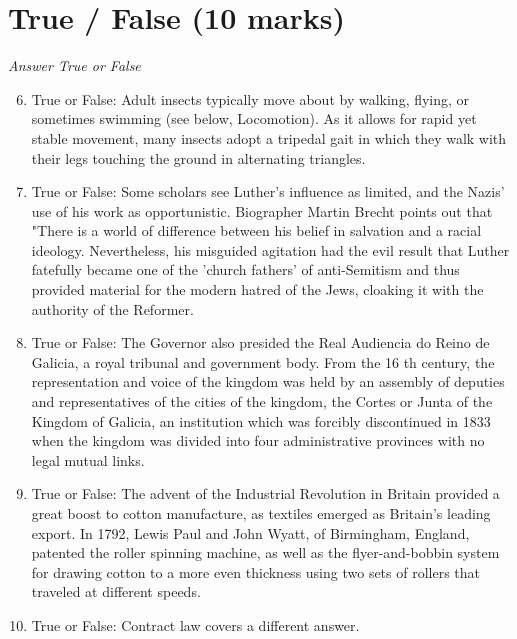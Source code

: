 \documentclass[12pt]{article}
\begin{document}
\section*{True / False (10 marks)}
\textit{Answer True or False}
\begin{enumerate}[label=\arabic*.]
\setcounter{enumi}{5}
\item True or False: Adult insects typically move about by walking, flying, or sometimes swimming (see below, Locomotion). As it allows for rapid yet stable movement, many insects adopt a tripedal gait in which they walk with their legs touching the ground in alternating triangles.
\item True or False: Some scholars see Luther's influence as limited, and the Nazis' use of his work as opportunistic. Biographer Martin Brecht points out that "There is a world of difference between his belief in salvation and a racial ideology. Nevertheless, his misguided agitation had the evil result that Luther fatefully became one of the 'church fathers' of anti-Semitism and thus provided material for the modern hatred of the Jews, cloaking it with the authority of the Reformer.
\item True or False: The Governor also presided the Real Audiencia do Reino de Galicia, a royal tribunal and government body. From the 16 th century, the representation and voice of the kingdom was held by an assembly of deputies and representatives of the cities of the kingdom, the Cortes or Junta of the Kingdom of Galicia, an institution which was forcibly discontinued in 1833 when the kingdom was divided into four administrative provinces with no legal mutual links.
\item True or False: The advent of the Industrial Revolution in Britain provided a great boost to cotton manufacture, as textiles emerged as Britain's leading export. In 1792, Lewis Paul and John Wyatt, of Birmingham, England, patented the roller spinning machine, as well as the flyer-and-bobbin system for drawing cotton to a more even thickness using two sets of rollers that traveled at different speeds.
\item True or False: Contract law covers a different answer.
\end{enumerate}
\end{document}
